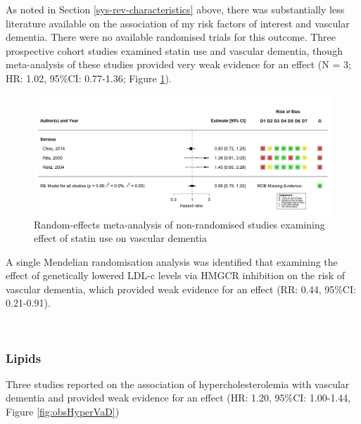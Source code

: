 \documentclass[a4paper, twoside]{templates/ociamthesis}
\begin{document}
As noted in Section \ref{sys-rev-characteristics} above, there was substantially less literature available on the association of my risk factors of interest and vascular dementia. There were no available randomised trials for this outcome. Three prospective cohort studies examined statin use and vascular dementia, though meta-analysis of these studies provided very weak evidence for an effect (N = 3; HR: 1.02, 95\%CI: 0.77-1.36; Figure \ref{fig:obsStatinVaDFig}).





\begin{figure}[H]
\includegraphics[width=1\linewidth]{figures/sys-rev/fp_obs_Statin-Ever_VaD} \caption[(ref:obsStatinDVaD-scap)]{Random-effects meta-analysis of non-randomised studies examining effect of statin use on vascular dementia}\label{fig:obsStatinVaDFig}
\end{figure}

A single Mendelian randomisation analysis was identified that examining the effect of genetically lowered LDL-c levels via HMGCR inhibition on the risk of vascular dementia, which provided weak evidence for an effect (RR: 0.44, 95\%CI: 0.21-0.91).

~

\hypertarget{lipids-2}{%
\subsubsection{Lipids}\label{lipids-2}}

Three studies reported on the association of hypercholesterolemia with vascular dementia and provided weak evidence for an effect (HR: 1.20, 95\%CI: 1.00-1.44, Figure \ref{fig:obsHyperVaD})
\end{document}
